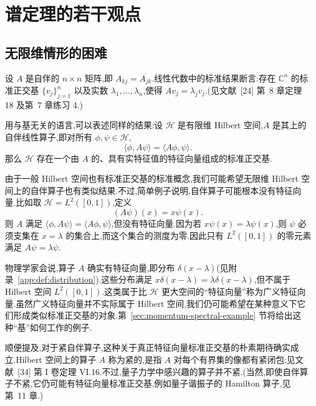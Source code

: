 \chapter{谱定理的若干观点}\label{chap:perspectives-spectral}

\section{无限维情形的困难}\label{sec:spectral-infinite-difficulties}

设 \(A\) 是自伴的 \(n\times n\) 矩阵,即 \(A_{kj}=\overline{A_{jk}}\).线性代数中的标准结果断言:存在 \(\mathbb{C}^{n}\) 的标准正交基 \(\{v_{j}\}_{j=1}^{n}\) 以及实数 \(\lambda_{1},\ldots,\lambda_{n}\),使得 \(Av_{j}=\lambda_{j}v_{j}\).(见文献~[24] 第~8 章定理 18 及第~7 章练习 4.)

用与基无关的语言,可以表述同样的结果:设 \(\mathcal{H}\) 是有限维 Hilbert 空间,\(A\) 是其上的自伴线性算子,即对所有 \(\phi,\psi\in\mathcal{H}\),
\[
\langle\phi,A\psi\rangle=\langle A\phi,\psi\rangle.
\]
那么 \(\mathcal{H}\) 存在一个由 \(A\) 的、具有实特征值的特征向量组成的标准正交基.

由于一般 Hilbert 空间也有标准正交基的标准概念,我们可能希望无限维 Hilbert 空间上的自伴算子也有类似结果.不过,简单例子说明,自伴算子可能根本没有特征向量.比如取 \(\mathcal{H}=L^{2}([0,1])\),定义
\begin{equation}
(A\psi)(x)=x\psi(x).
\label{eq:spectral-position-example}
\end{equation}
则 \(A\) 满足 \(\langle\phi,A\psi\rangle=\langle A\phi,\psi\rangle\),但没有特征向量.因为若 \(x\psi(x)=\lambda\psi(x)\),则 \(\psi\) 必须支集在 \(x=\lambda\) 的集合上,而这个集合的测度为零.因此只有 \(L^{2}([0,1])\) 的零元素满足 \(A\psi=\lambda\psi\).

物理学家会说,算子 \(A\) 确实有特征向量,即分布 \(\delta(x-\lambda)\)(见附录~\ref{app:def:distribution}).这些分布满足 \(x\delta(x-\lambda)=\lambda\delta(x-\lambda)\),但不属于 Hilbert 空间 \(L^{2}([0,1])\).这类属于比 \(\mathcal{H}\) 更大空间的“特征向量”称为广义特征向量.虽然广义特征向量并不实际属于 Hilbert 空间,我们仍可能希望在某种意义下它们形成类似标准正交基的对象.第~\ref{sec:momentum-spectral-example} 节将给出这种“基”如何工作的例子.

顺便提及,对于紧自伴算子,这种关于真正特征向量标准正交基的朴素期待确实成立.Hilbert 空间上的算子 \(A\) 称为紧的,是指 \(A\) 对每个有界集的像都有紧闭包;见文献~[34] 第 I 卷定理 VI.16.不过,量子力学中感兴趣的算子并不紧.(当然,即使自伴算子不紧,它仍可能有特征向量标准正交基,例如量子谐振子的 Hamilton 算子,见第~11 章.)

